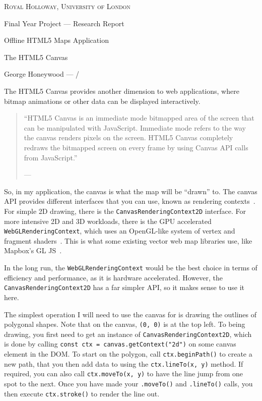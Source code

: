 


{
\centering
{\scshape\large Royal Holloway, University of London\par}
\vspace{0.5cm}
{\Huge Final Year Project --- Research Report\par}
\vspace{0.2cm}
{\Large Offline HTML5 Maps Application\par}
\vspace{0.2cm}
{\Huge The HTML5 Canvas\par}
\vspace{0.5cm}
{\large George Honeywood --- \the\month/\the\year\par}
\vspace{0.5cm}
}

The HTML5 Canvas provides another dimension to web applications, where bitmap animations or other data can be displayed interactively.

\begin{quote}
    ``HTML5 Canvas is an immediate mode bitmapped area of the screen that can be manipulated with JavaScript. Immediate mode refers to the way the canvas renders pixels on the screen. HTML5 Canvas completely redraws the bitmapped screen on every frame by using Canvas API calls from JavaScript.''

    \footnotesize{--- }
\end{quote}

So, in my application, the canvas is what the map will be ``drawn'' to. The canvas API provides different interfaces that you can use, known as rendering contexts~\cite{mdn-canvas-api}. For simple 2D drawing, there is the \texttt{CanvasRenderingContext2D} interface. For more intensive 2D and 3D workloads, there is the GPU accelerated \texttt{WebGLRenderingContext}, which uses an OpenGL-like system of vertex and fragment shaders~\cite{mdn-web-gl}. This is what some existing vector web map libraries use, like Mapbox's GL JS~\cite{mapbox-gl-js}.

In the long run, the \texttt{WebGLRenderingContext} would be the best choice in terms of efficiency and performance, as it is hardware accelerated. However, the \texttt{Canvas\-Rendering\-Context2D} has a far simpler API, so it makes sense to use it here.

The simplest operation I will need to use the canvas for is drawing the outlines of polygonal shapes. Note that on the canvas, \texttt{(0, 0)} is at the top left. To being drawing, you first need to get an instance of \texttt{Canvas\-Rendering\-Context2D}, which is done by calling \texttt{const ctx = canvas.getContext("2d")} on some canvas element in the DOM\@. To start on the polygon, call \texttt{ctx.beginPath()} to create a new path, that you then add data to using the \texttt{ctx.lineTo(x, y)} method. If required, you can also call \texttt{ctx.moveTo(x, y)} to have the line jump from one spot to the next. Once you have made your \texttt{.moveTo()} and \texttt{.lineTo()} calls, you then execute \texttt{ctx.stroke()} to render the line out.


